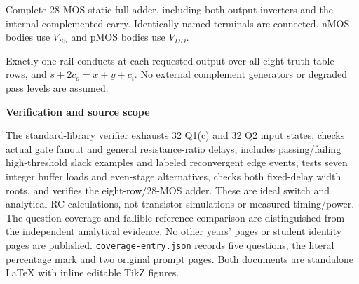 \documentclass[10pt]{article}
\newcommand{\mos}[4]{\begin{scope}[shift={(#1,#2)}]
\draw (0,.24)--(0,-.24);\draw (0,.20)--(.25,.20)--(.25,.5);
\draw (0,-.20)--(.25,-.20)--(.25,-.5);\draw (-.16,.23)--(-.16,-.23);
\ifnum#4=1\draw (-.26,0) circle (.06);\draw (-.75,0)--(-.32,0);\else\draw (-.75,0)--(-.16,0);\fi
\node[anchor=east,font=\scriptsize] at (-.76,0) {$#3$};\end{scope}}
\newcommand{\qheading}[1]{\par\medskip\textbf{#1}\par}
\begin{document}
\begin{center}
\end{center}
\small Complete 28-MOS static full adder, including both output inverters and the internal complemented carry. Identically named terminals are connected. nMOS bodies use $V_{SS}$ and pMOS bodies use $V_{DD}$.\normalsize\par
Exactly one rail conducts at each requested output over all eight truth-table rows, and $s+2c_o=x+y+c_i$. No external complement generators or degraded pass levels are assumed.
\qheading{Verification and source scope}
The standard-library verifier exhausts 32 Q1(c) and 32 Q2 input states, checks actual gate fanout and general resistance-ratio delays, includes passing/failing high-threshold slack examples and labeled reconvergent edge events, tests seven integer buffer loads and even-stage alternatives, checks both fixed-delay width roots, and verifies the eight-row/28-MOS adder. These are ideal switch and analytical RC calculations, not transistor simulations or measured timing/power.
The question coverage and fallible reference comparison are distinguished from the independent analytical evidence. No other years' pages or student identity pages are published. \texttt{coverage-entry.json} records five questions, the literal percentage mark and two original prompt pages. Both documents are standalone LaTeX with inline editable TikZ figures.
\end{document}
